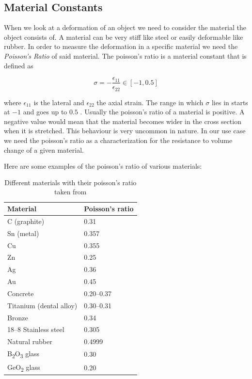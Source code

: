 \subsection{Material Constants}
When we look at a deformation of an object we need to consider the material the object consists of. A material can be very stiff like steel or easily deformable like rubber. In order to measure the deformation in a specific material we need the \textit{Poisson's Ratio} of said material. The poisson's ratio is a material constant that is defined as 

\[
	\sigma = - \frac{\epsilon_{11}}{\epsilon_{22}} \in [-1, 0.5]
\] 

where $\epsilon_{11}$ is the lateral and $\epsilon_{22}$ the axial strain. The range in which $\sigma$ lies in starts at $-1$ and goes up to $0.5$ \cite{PhysRevB.80.132104}. Usually the poisson's ratio of a material is positive. A negative value would mean that the material becomes wider in the cross section when it is stretched. This behaviour is very uncommon in nature. In our use case we need the poisson's ratio as a characterization for the resistance to volume change of a given material.

Here are some examples of the poisson's ratio of various materials:

\begin{table}[!htbp]
\centering
    \begin{tabular}{ | l | l |}
    \hline
    \textbf{Material} & \textbf{Poisson's ratio} \\ \hline
    C (graphite) & 0.31 \\ \hline
    Sn (metal) & 0.357 \\ \hline
    Cu & 0.355 \\ \hline
    Zn & 0.25 \\ \hline
    Ag & 0.36 \\ \hline
    Au & 0.45 \\ \hline
    Concrete & 0.20–0.37 \\ \hline
    Titanium (dental alloy) & 0.30–0.31 \\ \hline
    Bronze & 0.34 \\ \hline
    18–8 Stainless steel & 0.305 \\ \hline
    Natural rubber & 0.4999 \\ \hline
	B\textsubscript{2}O\textsubscript{3} glass & 0.30 \\ \hline
	GeO\textsubscript{2} glass & 0.20 \\ \hline	
    \end{tabular}
    \caption{Different materials with their poisson's ratio taken from \cite{PhysRevB.80.132104}}
\label{table:1}
\end{table}


